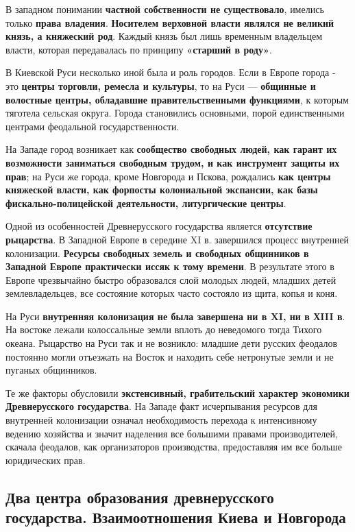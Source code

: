 \documentclass{article}
\begin{document}
 \hfill

 В западном понимании \textbf{частной собственности не существовало}, имелись только \textbf{права владения}. \textbf{Носителем верховной власти являлся не великий князь, а княжеский род}. Каждый князь был лишь временным владельцем власти, которая передавалась по принципу \textbf{«старший в роду»}.

 \hfill

В Киевской Руси несколько иной была и роль городов. Если в Европе города - это \textbf{центры торговли, ремесла и культуры}, то на Руси — \textbf{общинные и волостные центры, обладавшие правительственными функциями}, к которым тяготела сельская округа. Города становились основными, порой единственными центрами феодальной государственности.

На Западе город возникает как \textbf{сообщество свободных людей, как гарант их возможности заниматься свободным трудом, и как инструмент защиты их прав}; на Руси же города, кроме Новгорода и Пскова, рождались \textbf{как центры княжеской власти, как форпосты колониальной экспансии, как базы фискально-полицейской деятельности, литургические центры}.

\hfill

Одной из особенностей Древнерусского государства является \textbf{отсутствие рыцарства}. В Западной Европе в середине XI в. завершился процесс внутренней колонизации. \textbf{Ресурсы свободных земель и свободных общинников в Западной Европе практически иссяк к тому времени}. В результате этого в Европе чрезвычайно быстро образовался слой молодых людей, младших детей землевладельцев, все состояние которых часто состояло из щита, копья и коня.

На Руси \textbf{внутренняя колонизация не была завершена ни в XI, ни в ХIII в}. На востоке лежали колоссальные земли вплоть до неведомого тогда Тихого океана. Рыцарство на Руси так и не возникло: младшие дети русских феодалов постоянно могли отъезжать на Восток и находить себе нетронутые земли и не пуганых общинников.

Те же факторы обусловили \textbf{экстенсивный, грабительский характер экономики Древнерусского государства}. На Западе факт исчерпывания ресурсов для внутренней колонизации означал необходимость перехода к интенсивному ведению хозяйства и значит наделения все большими правами производителей, скачала феодалов, как организаторов производства, предоставляя им все больше юридических прав.

\subsection{Два центра образования древнерусского государства. Взаимоотношения Киева и Новгорода}
\end{document}
